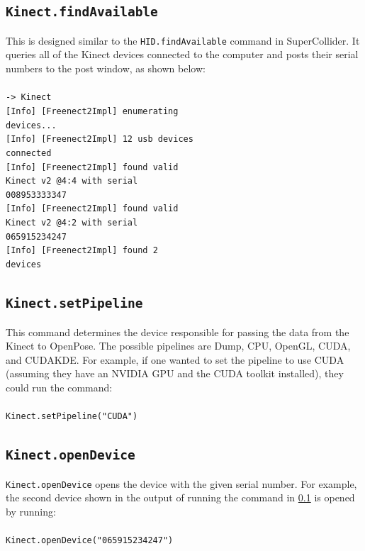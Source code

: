 \documentclass{article}
\begin{document}
\subsection{\texttt{Kinect.findAvailable}}\label{subsec:kinect_find_available}
This is designed similar to the \texttt{HID.findAvailable} command in SuperCollider. It queries all of the Kinect devices connected to the computer and posts their serial numbers to the post window, as shown below:\\
\texttt{\\
-> Kinect\\
{[Info]} {[Freenect2Impl]} enumerating \\ devices...\\
{[Info]} {[Freenect2Impl]} 12 usb devices \\ connected\\
{[Info]} {[Freenect2Impl]} found valid \\ Kinect v2 @4:4 with serial \\ 008953333347\\
{[Info]} {[Freenect2Impl]} found valid \\ Kinect v2 @4:2 with serial \\ 065915234247\\
{[Info]} {[Freenect2Impl]} found 2 \\ devices
}

\subsection{\texttt{Kinect.setPipeline}}\label{subsec:kinect_set_pipeline}
This command determines the device responsible for passing the data from the Kinect to OpenPose. The possible pipelines are Dump, CPU, OpenGL, CUDA, and CUDAKDE. For example, if one wanted to set the pipeline to use CUDA (assuming they have an NVIDIA GPU and the CUDA toolkit installed), they could run the command:\\
\\
\texttt{Kinect.setPipeline("CUDA")}
\subsection{\texttt{Kinect.openDevice}}\label{subsec:kinect_open_device}
\texttt{Kinect.openDevice} opens the device with the given serial number. For example, the second device shown in the output of running the command in \ref{subsec:kinect_find_available} is opened by running:\\
\\
\texttt{Kinect.openDevice("065915234247")}
\end{document}
